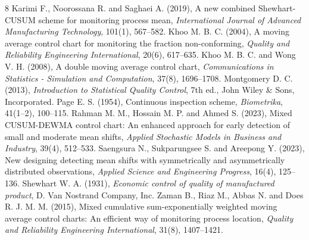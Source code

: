 \documentclass[twoside]{article}
\begin{document}
\begin{thebibliography}{8}
{\small
\setlength{\parskip}{0pt} 
\setlength{\itemsep}{-2pt}
Karimi F., Noorossana R. and Saghaei A. (2019), A new combined Shewhart-CUSUM scheme for monitoring process mean, {\it International Journal of Advanced Manufacturing Technology}, 101(1), 567--582.
Khoo M. B. C. (2004), A moving average control chart for monitoring the fraction non-conforming, {\it Quality and Reliability Engineering International}, 20(6), 617--635.
Khoo M. B. C. and Wong V. H. (2008), A double moving average control chart, {\it Communications in Statistics - Simulation and Computation}, 37(8), 1696--1708.
Montgomery D. C. (2013), {\it Introduction to Statistical Quality Control}, 7th ed., John Wiley \& Sons, Incorporated.
Page E. S. (1954), Continuous inspection scheme, {\it Biometrika}, 41(1--2), 100--115.
Rahman M. M., Hossain M. P. and Ahmed S. (2023), Mixed CUSUM-DEWMA control chart: An enhanced approach for early detection of small and moderate mean shifts, {\it Applied Stochastic Models in Business and Industry}, 39(4), 512--533.
Saengsura N., Sukparungsee S. and Areepong Y. (2023), New designing detecting mean shifts with symmetrically and asymmetrically distributed observations, {\it Applied Science and Engineering Progress}, 16(4), 125--136.
Shewhart W. A. (1931), {\it Economic control of quality of manufactured product}, D. Van Nostrand Company, Inc.
Zaman B., Riaz M., Abbas N. and Does R. J. M. M. (2015), Mixed cumulative sum-exponentially weighted moving average control charts: An efficient way of monitoring process location, {\it Quality and Reliability Engineering International}, 31(8), 1407--1421.}
\end{thebibliography}
 
\end{document}
